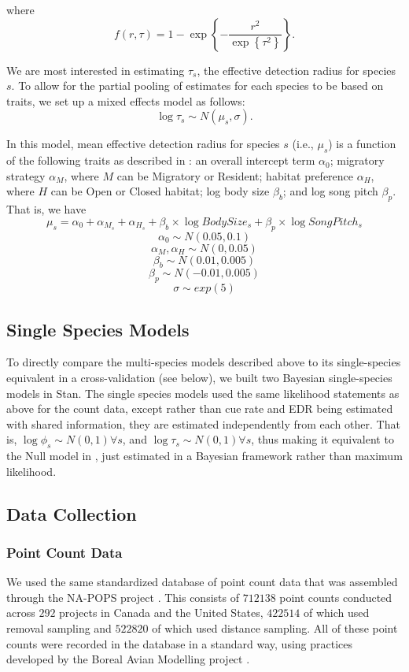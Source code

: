 \documentclass[12pt]{article}
\begin{document}
where 
$$f(r,\tau) =  1 - \exp\left\{ -\dfrac{r^2}{\exp\left\{\tau^2\right\}} \right\} .$$

\par We are most interested in estimating $\tau_s$, the effective detection radius for species $s$. 
To allow for the partial pooling of estimates for each species to be based on traits, we set up a mixed effects model as follows:
$$\log \tau_s \sim N(\mu_s, \sigma).$$

\par In this model, mean effective detection radius for species $s$ (i.e., $\mu_s$) is a function of the following traits as described in \cite{solymos_phylogeny_2018}: an overall intercept term $\alpha_0$; migratory strategy $\alpha_M$, where $M$ can be Migratory or Resident; habitat preference $\alpha_H$, where $H$ can be Open or Closed habitat; log body size $\beta_b$; and log song pitch $\beta_p$. 
That is, we have
$$ \mu_s = \alpha_0 + \alpha_{M_s} + \alpha_{H_s} + \beta_b \times \log BodySize_s + \beta_p \times \log SongPitch_s$$
$$\alpha_0 \sim N(0.05, 0.1)$$
$$ \alpha_M, \alpha_H \sim N(0, 0.05)$$
$$ \beta_b \sim N(0.01, 0.005)$$
$$ \beta_p \sim N(-0.01, 0.005) $$
$$\sigma \sim exp(5)$$

\subsection{Single Species Models}

\par To directly compare the multi-species models described above to its single-species equivalent in a cross-validation (see below), we built two Bayesian single-species models in Stan.
The single species models used the same likelihood statements as above for the count data, except rather than cue rate and EDR being estimated with shared information, they are estimated independently from each other.
That is, $\log \phi_s \sim N(0,1) \forall s$, and $\log \tau_s \sim N(0,1) \forall s$, thus making it equivalent to the Null model in \citet{edwards_point_2023}, just estimated in a Bayesian framework rather than maximum likelihood. 

\subsection{Data Collection}
\subsubsection{Point Count Data}
\par We used the same standardized database of point count data that was assembled through the NA-POPS project \cite{edwards_point_2023}. 
This consists of $712138$ point counts conducted across $292$ projects in Canada and the United States, $422514$ of which used removal sampling and $522820$ of which used distance sampling.
All of these point counts were recorded in the database in a standard way, using practices developed by the Boreal Avian Modelling project \citep{barker_ecological_2015}.
\end{document}
